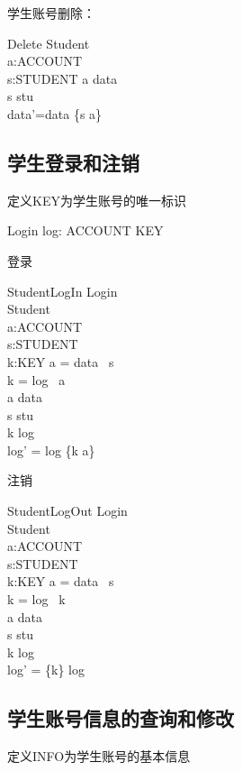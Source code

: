\documentclass{article}
\begin{document}
\begin{CJK}{UTF8}{gbsn}
\begin{spacing}{1.4}
学生账号删除：
\begin{schema}{Delete} 
	\Delta Student\\
	a:ACCOUNT\\
	s:STUDENT
\where 
	a \in \dom data \\
	s \in stu \\
	data'=data \hide \{s \mapsto a\}
\end{schema}

\subsection{学生登录和注销}
定义KEY为学生账号的唯一标识
\begin{zed}[KEY]\end{zed}

\begin{schema}{Login}
log:	ACCOUNT \pfun KEY 
\end{schema}
登录
\begin{schema}{StudentLogIn}
\Xi Login\\
\Delta Student\\
a:ACCOUNT\\
s:STUDENT\\
k:KEY
\where 
a = data \ s\\
k = log  \ a\\
a \in \dom data \\
	s \in stu \\
k \notin \dom log\\
log' = log \cup \{k \mapsto a\}
\end{schema}
注销
\begin{schema}{StudentLogOut}
\Xi Login\\
\Delta Student\\
a:ACCOUNT\\
s:STUDENT\\
k:KEY
\where 
a = data \ s\\
k = log \ k\\
a \in \dom data \\
	s \in stu \\
k \in \dom log\\
log' = \{k\} \ndres log
\end{schema}

\subsection{学生账号信息的查询和修改}
定义INFO为学生账号的基本信息
\begin{zed}[INFO]\end{zed}


\end{spacing}
\end{CJK}
\end{document}
